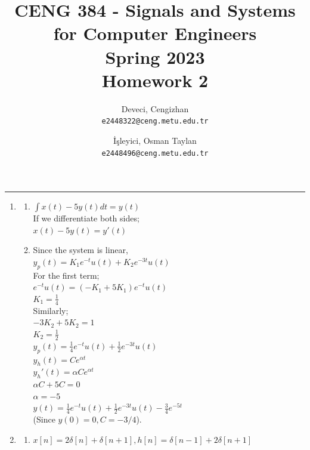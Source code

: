 \documentclass[10pt,a4paper, margin=1in]{article}
\author{
  Deveci, Cengizhan\\
  \texttt{e2448322@ceng.metu.edu.tr}
  \and
  İşleyici, Osman Taylan\\
  \texttt{e2448496@ceng.metu.edu.tr}
}
\title{CENG 384 - Signals and Systems for Computer Engineers \\
Spring 2023 \\
Homework 2}
\begin{document}
\maketitle



\noindent\rule{19cm}{1.2pt}

\begin{enumerate}

\item %
    \begin{enumerate}
    \item $\int x(t) - 5 y(t) dt = y(t)$\\
    If we differentiate both sides;\\
    $x(t) - 5y(t) = y'(t)$\\
    \item %
    Since the system is linear,\\
    $y_p(t) = K_1e^{-t}u(t) + K_2e^{-3t}u(t)$\\
    For the first term;\\
    $e^{-t}u(t) = (-K_1 + 5K_1)e^{-t}u(t)$\\
    $K_1 = \frac{1}{4}$\\
    Similarly;\\
    $-3K_2 + 5K_2 = 1$\\
    $K_2 = \frac{1}{2}$\\
    $y_p(t) = \frac{1}{4}e^{-t}u(t) + \frac{1}{2}e^{-3t}u(t)$\\
    $y_h(t) = Ce^{\alpha t}$\\
    $y_h'(t) = \alpha C e^{\alpha t}$\\
    $\alpha C + 5 C = 0$\\
    $\alpha = -5$\\
    $y(t) = \frac{1}{4}e^{-t}u(t) + \frac{1}{2}e^{-3t}u(t) - \frac{3}{4}e^{-5t}$\\
    (Since $y(0) = 0, C = -3/4$).\\
    \end{enumerate}

\item %
	\begin{enumerate}
    \item %
    $x[n] = 2 \delta [n] + \delta [n+1], h[n] = \delta[n-1]+2\delta[n+1]$\\


\end{enumerate}
\end{enumerate}
\end{document}
